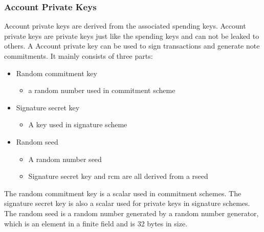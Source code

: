 \subsubsection{Account Private Keys}\label{section: account-private-keys}

Account private keys are derived from the associated spending keys. Account private keys are private keys just like the spending keys and can not be leaked to others. A Account private key can be used to sign transactions and generate note commitments. It mainly consists of three parts:

\begin{itemize}
    \item Random commitment key
        \begin{itemize}
            \item a random number used in commitment scheme
        \end{itemize}
    \item Signature secret key
        \begin{itemize}
            \item A key used in signature scheme
        \end{itemize}
    \item Random seed
        \begin{itemize}
            \item A random number seed
            \item Signature secret key and rcm are all derived from a rseed
        \end{itemize}
\end{itemize}

The random commitment key is a scalar used in commitment schemes. The signature secret key is also a scalar used for private keys in signature schemes. The random seed is a random number generated by a random number generator, which is an element in a finite field and is 32 bytes in size.